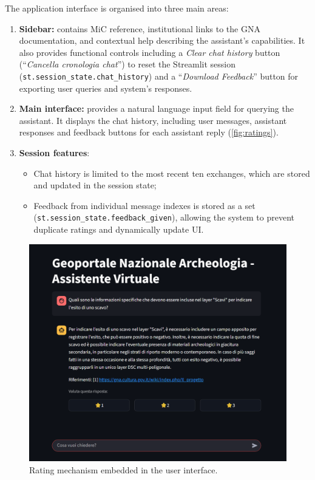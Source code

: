 \begin{spacing}{1.5}
\noindent The application interface is organised into three main areas:
\begin{enumerate}
      \item \textbf{Sidebar:} contains MiC reference, institutional links to the GNA documentation, and contextual help describing the assistant’s capabilities. It also provides functional controls including a \textit{Clear chat history} button (``\textit{Cancella cronologia chat}'') to reset the Streamlit session (\texttt{st.session\_state.chat\_history}) and a ``\textit{Download Feedback}'' button for exporting user queries and system's responses.
      \item \textbf{Main interface:} provides a natural language input field for querying the assistant. It displays the chat history, including user messages, assistant responses and feedback buttons for each assistant reply (\autoref{fig:ratings}).
      \item \textbf{Session features}: 
      \begin{itemize}
            \item Chat history is limited to the most recent ten exchanges, which are stored and updated in the session state;
            \item Feedback from individual message indexes is stored as a set (\texttt{st.session\_state.feedback\_given}), allowing the system to prevent duplicate ratings and dynamically update UI.
      \end{itemize}
\end{enumerate}


\begin{figure}[H]
  \centering
  \includegraphics[width=\textwidth]{images/ui_ratings.png} 
  \caption{Rating mechanism embedded in the user interface.}
  \label{fig:ratings}
\end{figure}


\end{spacing}
